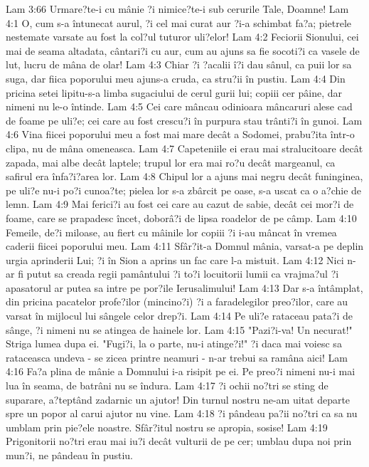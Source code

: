 Lam 3:66  Urmare?te-i cu mânie ?i nimice?te-i sub cerurile Tale, Doamne!
Lam 4:1  O, cum s-a întunecat aurul, ?i cel mai curat aur ?i-a schimbat fa?a; pietrele nestemate varsate au fost la col?ul tuturor uli?elor!
Lam 4:2  Feciorii Sionului, cei mai de seama altadata, cântari?i cu aur, cum au ajuns sa fie socoti?i ca vasele de lut, lucru de mâna de olar!
Lam 4:3  Chiar ?i ?acalii î?i dau sânul, ca puii lor sa suga, dar fiica poporului meu ajuns-a cruda, ca stru?ii în pustiu.
Lam 4:4  Din pricina setei lipitu-s-a limba sugaciului de cerul gurii lui; copiii cer pâine, dar nimeni nu le-o întinde.
Lam 4:5  Cei care mâncau odinioara mâncaruri alese cad de foame pe uli?e; cei care au fost crescu?i în purpura stau trânti?i în gunoi.
Lam 4:6  Vina fiicei poporului meu a fost mai mare decât a Sodomei, prabu?ita într-o clipa, nu de mâna omeneasca.
Lam 4:7  Capeteniile ei erau mai stralucitoare decât zapada, mai albe decât laptele; trupul lor era mai ro?u decât margeanul, ca safirul era înfa?i?area lor.
Lam 4:8  Chipul lor a ajuns mai negru decât funinginea, pe uli?e nu-i po?i cunoa?te; pielea lor s-a zbârcit pe oase, s-a uscat ca o a?chie de lemn.
Lam 4:9  Mai ferici?i au fost cei care au cazut de sabie, decât cei mor?i de foame, care se prapadesc încet, doborâ?i de lipsa roadelor de pe câmp.
Lam 4:10  Femeile, de?i miloase, au fiert cu mâinile lor copiii ?i i-au mâncat în vremea caderii fiicei poporului meu.
Lam 4:11  Sfâr?it-a Domnul mânia, varsat-a pe deplin urgia aprinderii Lui; ?i în Sion a aprins un fac care l-a mistuit.
Lam 4:12  Nici n-ar fi putut sa creada regii pamântului ?i to?i locuitorii lumii ca vrajma?ul ?i apasatorul ar putea sa intre pe por?ile Ierusalimului!
Lam 4:13  Dar s-a întâmplat, din pricina pacatelor profe?ilor (mincino?i) ?i a faradelegilor preo?ilor, care au varsat în mijlocul lui sângele celor drep?i.
Lam 4:14  Pe uli?e rataceau pata?i de sânge, ?i nimeni nu se atingea de hainele lor.
Lam 4:15  "Pazi?i-va! Un necurat!" Striga lumea dupa ei. "Fugi?i, la o parte, nu-i atinge?i!" ?i daca mai voiesc sa rataceasca undeva - se zicea printre neamuri - n-ar trebui sa ramâna aici!
Lam 4:16  Fa?a plina de mânie a Domnului i-a risipit pe ei. Pe preo?i nimeni nu-i mai lua în seama, de batrâni nu se îndura.
Lam 4:17  ?i ochii no?tri se sting de suparare, a?teptând zadarnic un ajutor! Din turnul nostru ne-am uitat departe spre un popor al carui ajutor nu vine.
Lam 4:18  ?i pândeau pa?ii no?tri ca sa nu umblam prin pie?ele noastre. Sfâr?itul nostru se apropia, sosise!
Lam 4:19  Prigonitorii no?tri erau mai iu?i decât vulturii de pe cer; umblau dupa noi prin mun?i, ne pândeau în pustiu.
